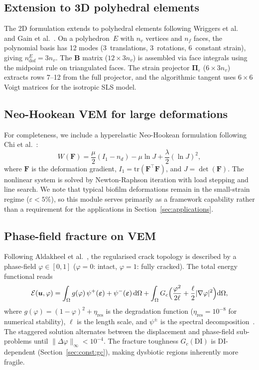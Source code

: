 \documentclass[smallextended]{svjour3}
\newcommand{\vect}[1]{\bm{#1}}
\newcommand{\mat}[1]{\mathbf{#1}}
\renewcommand{\tens}[1]{\boldsymbol{#1}}
\newcommand{\dd}{\mathrm{d}}
\newcommand{\DI}{\mathrm{DI}}
\newcommand{\tr}{\mathrm{tr}}
\newcommand{\pf}{\varphi}
\begin{document}
\subsection{Extension to 3D polyhedral elements}
\label{sec:vem:3d}

The 2D formulation extends to polyhedral elements following
Wriggers et al.~\cite{Wriggers2019,Wriggers2024} and
Gain et al.~\cite{Gain2014}.
On a polyhedron~$E$ with $n_v$ vertices and $n_f$ faces,
the polynomial basis has 12 modes
(3~translations, 3~rotations, 6~constant strain),
giving $n_\mathrm{dof}^E = 3 n_v$.
The $\mat{B}$ matrix ($12 \times 3n_v$) is assembled via
face integrals using the midpoint rule on triangulated faces.
The strain projector
$\tens{\Pi}_\varepsilon$ ($6 \times 3n_v$) extracts rows 7--12
from the full projector, and the algorithmic tangent uses
$6 \times 6$ Voigt matrices for the isotropic SLS model.

\subsection{Neo-Hookean VEM for large deformations}
\label{sec:vem:nh}

For completeness, we include a hyperelastic Neo-Hookean
formulation following Chi et al.~\cite{Chi2017}:
\begin{equation}
  W(\mat{F}) = \frac{\mu}{2}(I_1 - n_d) - \mu \ln J
  + \frac{\lambda}{2}(\ln J)^2,
  \label{eq:neohook}
\end{equation}
where $\mat{F}$ is the deformation gradient,
$I_1 = \tr(\mat{F}^\top\mat{F})$, and $J = \det(\mat{F})$.
The nonlinear system is solved by Newton-Raphson iteration with load
stepping and line search.
We note that typical biofilm deformations remain in the small-strain
regime ($\varepsilon < 5\%$), so this module serves primarily as a
framework capability rather than a requirement for the applications
in Section~\ref{sec:applications}.

\subsection{Phase-field fracture on VEM}
\label{sec:vem:pf}

Following Aldakheel et al.~\cite{Aldakheel2018}, the regularised
crack topology is described by a phase-field
$\pf \in [0,1]$ ($\pf{=}0$: intact, $\pf{=}1$: fully cracked).
The total energy functional reads
\begin{equation}
  \mathcal{E}(\vect{u}, \pf) = \int_\Omega g(\pf)\,\psi^+(\tens{\varepsilon})
  + \psi^-(\tens{\varepsilon})\,\dd\Omega
  + \int_\Omega G_c\Bigl(\frac{\pf^2}{2\ell}
  + \frac{\ell}{2}|\nabla \pf|^2\Bigr)\dd\Omega,
\end{equation}
where $g(\pf) = (1-\pf)^2 + \eta_\mathrm{res}$ is the degradation
function ($\eta_\mathrm{res} = 10^{-8}$ for numerical stability),
$\ell$ is the length scale, and $\psi^\pm$ is the spectral
decomposition~\cite{Miehe2010,Bourdin2000}.
The staggered solution alternates between the displacement
and phase-field sub-problems until $\|\Delta\pf\|_\infty < 10^{-4}$.
The fracture toughness $G_c(\DI)$ is DI-dependent
(Section~\ref{sec:const:gc}), making dysbiotic regions inherently more
fragile.
\end{document}
